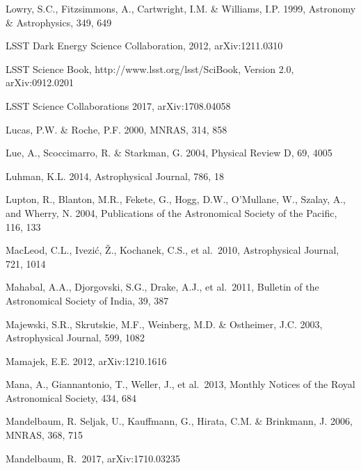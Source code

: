\documentclass[twocolumn]{aastex61}
\begin{document}
\begin{thebibliography}{}
 Lowry, S.C., Fitzsimmons, A., Cartwright, I.M. \& Williams, I.P. 1999, Astronomy \& Astrophysics, 349, 649

 LSST Dark Energy Science Collaboration, 2012, arXiv:1211.0310

 LSST Science Book, http://www.lsst.org/lsst/SciBook,  Version 2.0, arXiv:0912.0201

 LSST Science Collaborations 2017, arXiv:1708.04058

 Lucas, P.W. \& Roche, P.F. 2000, MNRAS, 314, 858

 Lue, A., Scoccimarro, R. \& Starkman, G. 2004, Physical Review D, 69, 4005

 Luhman, K.L. 2014,  Astrophysical Journal, 786, 18

 Lupton, R., Blanton, M.R., Fekete, G., Hogg, D.W., O'Mullane, W., Szalay, A., and Wherry, N. 2004, Publications of the Astronomical Society of the Pacific, 116, 133

 MacLeod, C.L., Ivezi\'{c}, \v{Z}., Kochanek, C.S., et al.~2010, Astrophysical Journal, 721, 1014

 Mahabal, A.A., Djorgovski, S.G., Drake, A.J., et al.~2011, Bulletin of the Astronomical Society of India, 39, 387

 Majewski, S.R., Skrutskie, M.F., Weinberg, M.D. \& Ostheimer, J.C. 2003, Astrophysical Journal, 599, 1082

 Mamajek, E.E. 2012, arXiv:1210.1616

 Mana, A., Giannantonio, T., Weller, J., et al.~2013, Monthly Notices of the Royal Astronomical Society, 434, 684

 Mandelbaum, R. Seljak, U., Kauffmann, G., Hirata, C.M. \& Brinkmann, J. 2006, MNRAS, 368, 715

 Mandelbaum, R.~2017, arXiv:1710.03235


\end{thebibliography}
\end{document}
